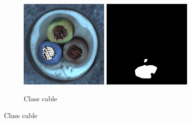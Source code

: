 \begin{figure}[ht]
\begin{subfigure}[b]{0.3\textwidth}
    \end{subfigure}
    \hfill
    \begin{subfigure}[b]{0.3\textwidth}
        \centering
        \includegraphics[width=0.475\textwidth]{figures/mvtecadexampleimages/cable009.png}
        \includegraphics[width=0.475\textwidth]{figures/mvtecadexampleimages/cable009_mask.png}
        \caption*{Class cable}


\end{subfigure}
\end{figure}
